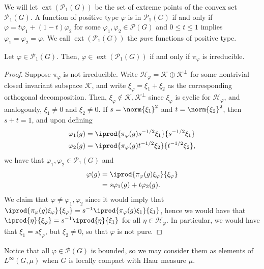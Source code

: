 \documentclass[10pt]{mypackage}
\begin{document}
We will let $\operatorname{ext}\left( \mathcal{P}_1(G) \right)$ be the set of extreme points of the convex set $\mathcal{P}_1(G)$. A function of positive type $\varphi$ is in $\mathcal{P}_1(G)$ if and only if $\varphi = t\varphi_1 + \left( 1-t \right)\varphi_2$ for some $\varphi_1,\varphi_2\in \mathcal{P}(G)$ and $0\leq t \leq 1$ implies $\varphi_1 = \varphi_2 = \varphi$. We call $ \operatorname{ext}\left( \mathcal{P}_1(G) \right) $ the \textit{pure} functions of positive type.
\begin{theorem}
  Let $\varphi\in \mathcal{P}_1\left( G \right)$. Then, $\varphi\in \operatorname{ext}\left( \mathcal{P}_1(G) \right)$ if and only if $\pi_{\varphi}$ is irreducible.
\end{theorem}
\begin{proof}
  Suppose $\pi_{\varphi}$ is not irreducible. Write $ \mathscr{H}_{\varphi} = \mathscr{K} \oplus \mathscr{K}^{\perp} $ for some nontrivial closed invariant subspace $ \mathscr{K} $, and write $\xi_{\varphi} = \xi_1 + \xi_2$ as the corresponding orthogonal decomposition. Then, $\xi_{\varphi}\notin \mathscr{K},\mathscr{K}^{\perp}$ since $\xi_{\varphi}$ is cyclic for $ \mathscr{H}_{\varphi} $, and analogously, $\xi_1\neq 0$ and $\xi_2\neq 0$. If $s = \norm{\xi_1}^2$ and $t = \norm{\xi_2}^2$, then $s + t = 1$, and upon defining
  \begin{align*}
    \varphi_1(g) &= \iprod{\pi_{\varphi}(g)s^{-1/2}\xi_1}{s^{-1/2}\xi_1}\\
    \varphi_2(g) &= \iprod{\pi_{\varphi}(g)t^{-1/2}\xi_2}{t^{-1/2}\xi_2},
  \end{align*}
  we have that $\varphi_1,\varphi_2\in \mathcal{P}_1(G)$ and
  \begin{align*}
    \varphi(g) &= \iprod{\pi_{\varphi}(g)\xi_{\varphi}}{\xi_{\varphi}}\\
               &= s\varphi_1(g) + t\varphi_2(g).
  \end{align*}
  We claim that $\varphi\neq \varphi_1,\varphi_2$ since it would imply that $ \iprod{\pi_{\varphi}(g)\xi_{\varphi}}{\xi_{\varphi}} = s^{-1} \iprod{\pi_{\varphi}(g)\xi_1}{\xi_1} $, hence we would have that $ \iprod{\eta}{\xi_{\varphi}} = s^{-1} \iprod{\eta}{\xi_1} $ for all $\eta\in \mathscr{H}_{\varphi}$. In particular, we would have that $\xi_1 = s\xi_{\varphi}$, but $\xi_2\neq 0$, so that $\varphi$ is not pure.
\end{proof}
Notice that all $\varphi\in \mathcal{P}\left( G \right)$ is bounded, so we may consider them as elements of $L^{\infty}\left( G,\mu \right)$ when $G$ is locally compact with Haar measure $\mu$.
\end{document}
